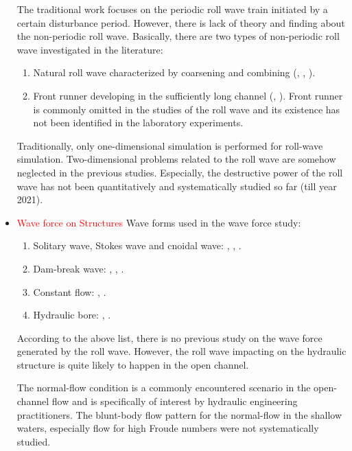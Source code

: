 \documentclass{jfm}
\begin{document}
\begin{itemize}
	The traditional work focuses on the periodic roll wave train initiated by a certain disturbance period. However, there is lack of theory and finding about the non-periodic roll wave. Basically, there are two types of non-periodic roll wave investigated in the literature:
	\begin{enumerate}
		\item Natural roll wave characterized by coarsening and combining (\cite{Zanuttigh2002}, \cite{Cao2015}, \cite{Ivanova2017}).
		
		\item Front runner developing in the sufficiently long channel (\cite{Liu1994}, \cite{Yu2021}).  Front runner is commonly omitted in the studies of the roll wave and its existence has not been identified in the laboratory experiments.
	\end{enumerate}
	
	
	Traditionally, only one-dimensional simulation is performed for roll-wave simulation. Two-dimensional  problems related to the roll wave are somehow neglected in the previous studies. Especially, the destructive power of the roll wave has not been quantitatively and systematically studied so far (till year 2021).
	
	
	\item \textcolor{Red}{Wave force on Structures}
	Wave forms used in the wave force study:
	\begin{enumerate}
		\item Solitary wave, Stokes wave and cnoidal wave: \cite{Robertson2013}, \cite{Zhong2009},  \cite{Kamath2015}.
		\item Dam-break wave: \cite{Qin2018}, \cite{Vire2016}, \cite{Douglas2015}. 
		\item Constant flow: \cite{Cassan2014}, \cite{Jacobs2015}.
		\item Hydraulic bore: \cite{Xie2019}, \cite{An2012}.
	\end{enumerate}
According to the above list, there is no previous study on the wave force generated by the roll wave. However, the roll wave impacting on the hydraulic structure is quite likely to happen in the open channel.

The normal-flow condition is a commonly encountered scenario in the  open-channel flow and is specifically of interest by hydraulic engineering practitioners. The blunt-body flow pattern for the normal-flow in the shallow waters, especially flow for high Froude numbers were not systematically studied.
	

\end{itemize}
\end{document}
